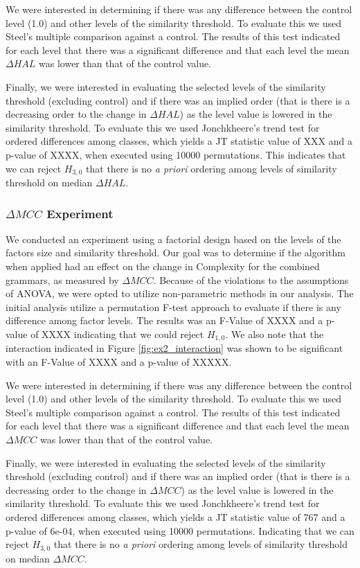 \documentclass[10pt,nocc]{xrese_report}
\begin{document}
We were interested in determining if there was any difference between the control level (1.0) and other levels of the similarity threshold. To evaluate this we used Steel's multiple comparison against a control. The results of this test indicated for each level that there was a significant difference and that each level the mean $\Delta HAL$ was lower than that of the control value.

Finally, we were interested in evaluating the selected levels of the similarity threshold (excluding control) and if there was an implied order (that is there is a decreasing order to the change in $\Delta HAL$) as the level value is lowered in the similarity threshold. To evaluate this we used Jonchkheere's trend test for ordered differences among classes, which yields a JT statistic value of XXX and a p-value of XXXX, when executed using 10000 permutations. This indicates that we can reject $H_{3,0}$ that there is no \textit{a priori} ordering among levels of similarity threshold on median $\Delta HAL$.

\subsubsection{$\Delta MCC$ Experiment}

We conducted an experiment using a factorial design based on the levels of the factors size and similarity threshold. Our goal was to determine if the algorithm when applied had an effect on the change in Complexity for the combined grammars, as measured by $\Delta MCC$. Because of the violations to the assumptions of ANOVA, we were opted to utilize non-parametric methods in our analysis. The initial analysis utilize a permutation F-test approach to evaluate if there is any difference among factor levels. The results was an F-Value of XXXX and a p-value of XXXX indicating that we could reject $H_{1,0}$. We also note that the interaction indicated in Figure \ref{fig:ex2_interaction} was shown to be significant with an F-Value of XXXX and a p-value of XXXXX.

We were interested in determining if there was any difference between the control level (1.0) and other levels of the similarity threshold. To evaluate this we used Steel's multiple comparison against a control. The results of this test indicated for each level that there was a significant difference and that each level the mean $\Delta MCC$ was lower than that of the control value.

Finally, we were interested in evaluating the selected levels of the similarity threshold (excluding control) and if there was an implied order (that is there is a decreasing order to the change in $\Delta MCC$) as the level value is lowered in the similarity threshold. To evaluate this we used Jonchkheere's trend test for ordered differences among classes, which yields a JT statistic value of 767 and a p-value of 6e-04, when executed using 10000 permutations. Indicating that we can reject $H_{3,0}$ that there is no \textit{a priori} ordering among levels of similarity threshold on median $\Delta MCC$.
\end{document}
